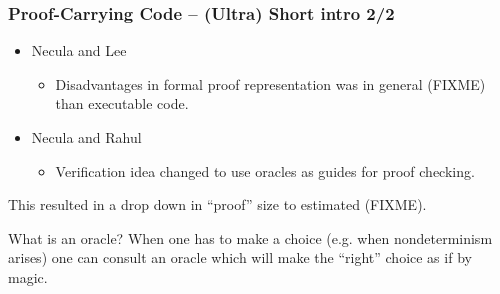\documentclass[slidestop,compress,mathserif, xcolor=table]{beamer}
\begin{document}
\begin{frame}
  \frametitle{Proof-Carrying Code -- (Ultra) Short intro 2/2}



  \begin{itemize}
  \item Necula and Lee
    \begin{itemize}
    \item Disadvantages in formal proof representation was in general (FIXME)
       than executable code.
    \end{itemize}

  \item Necula and Rahul \cite{nera2001}
    \begin{itemize}
    \item Verification idea changed to use oracles as guides for proof checking.
    \end{itemize}
  \end{itemize}

  This resulted in a drop down in ``proof'' size to estimated (FIXME).
  
  \begin{block}{What is an oracle?}
    When one has to make a choice (e.g. when nondeterminism arises) one can
    consult an oracle which will make the ``right'' choice as if by
    magic.
  \end{block}

  
\end{frame}
\end{document}
